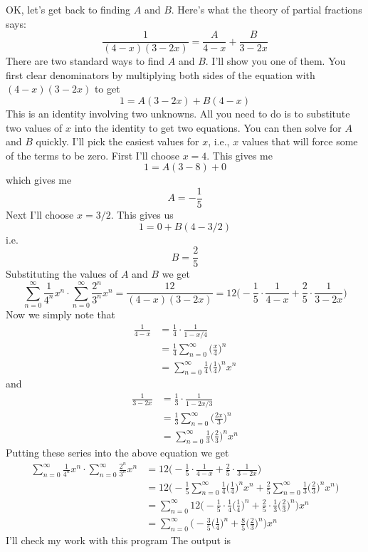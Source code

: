 OK, let's get back to finding $A$ and $B$.
Here's what the theory of partial fractions says:
\[
\frac{1}{(4-x)(3-2x)}
=
\frac{A}{4-x} +
\frac{B}{3-2x}
\]
There are two standard ways to find $A$ and $B$.
I'll show you one of them.
You first clear denominators by multiplying both sides
of the equation with $(4-x)(3-2x)$ to get
\[
1
=
A(3 - 2x) +
B(4 - x)
\]
This is an identity involving two unknowns.
All you need to do is to substitute two values of $x$ into the 
identity to get two equations.
You can then solve for $A$ and $B$ quickly.
I'll pick the easiest values for $x$,
i.e., $x$ values that will force some of the terms to be zero.
First I'll choose $x = 4$.
This gives me
\[
1 = A(3 - 8) + 0
\]
which gives me
\[
A = -\frac{1}{5}
\]
Next I'll choose $x = 3/2$.
This gives us
\[
1 = 0 + B(4 - 3/2)
\]
i.e.
\[
B = \frac{2}{5}
\]
Substituting the values of $A$ and $B$ we get
\[
\sum_{n=0}^\infty \frac{1}{4^n} x^n 
\cdot 
\sum_{n=0}^\infty \frac{2^n}{3^n} x^n 
= \frac{12}{(4-x)(3-2x)} 
= 12 \biggl( 
-\frac{1}{5} \cdot \frac{1}{4-x} +
\frac{2}{5}\cdot \frac{1}{3-2x}
\biggr)
\]
Now we simply note that
\begin{align*}
\frac{1}{4-x} 
&= \frac{1}{4} \cdot \frac{1}{1 - x/4}  \\
&= \frac{1}{4} \sum_{n=0}^\infty \biggl(\frac{x}{4} \biggr)^n \\
&= \sum_{n=0}^\infty \frac{1}{4} \biggl( \frac{1}{4} \biggr)^n x^n
\end{align*}
and
\begin{align*}
\frac{1}{3-2x} 
&= \frac{1}{3} \cdot \frac{1}{1 - 2x/3}  \\
&= \frac{1}{3} \sum_{n=0}^\infty \biggl(\frac{2x}{3} \biggr)^n \\
&= \sum_{n=0}^\infty \frac{1}{3} \biggl( \frac{2}{3} \biggr)^n x^n
\end{align*}
Putting these series into the above equation we get
\begin{align*}
\sum_{n=0}^\infty \frac{1}{4^n} x^n 
\cdot 
\sum_{n=0}^\infty \frac{2^n}{3^n} x^n  
&= 
12 \biggl( 
-\frac{1}{5} \cdot \frac{1}{4-x} +
\frac{2}{5} \cdot \frac{1}{3-2x}
\biggr) \\
&=
12 \biggl( 
-\frac{1}{5}  \sum_{n=0}^\infty \frac{1}{4} \biggl( \frac{1}{4} \biggr)^n x^n +
\frac{2}{5}  \sum_{n=0}^\infty \frac{1}{3} \biggl( \frac{2}{3} \biggr)^n x^n
\biggr) \\
&=
\sum_{n=0}^\infty 
12 \biggl( 
-\frac{1}{5} \cdot \frac{1}{4} \biggl( \frac{1}{4} \biggr)^n +
\frac{2}{5} \cdot \frac{1}{3} \biggl( \frac{2}{3} \biggr)^n
\biggr) x^n\\
&=
\sum_{n=0}^\infty 
\biggl( 
-\frac{3}{5} \biggl( \frac{1}{4} \biggr)^n +
\frac{8}{5} \biggl( \frac{2}{3} \biggr)^n
\biggr) x^n
\end{align*}
I'll check my work with this program
The output is

